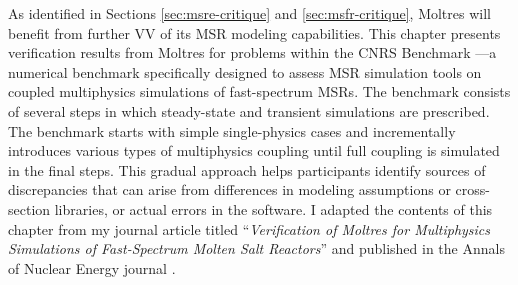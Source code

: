 As identified in Sections \ref{sec:msre-critique} and \ref{sec:msfr-critique},
Moltres will benefit from further \gls{VV} of its
\gls{MSR} modeling capabilities. This chapter presents verification
results from Moltres for problems within the CNRS Benchmark
\cite{tiberga_results_2020}---a numerical benchmark specifically designed to
assess \gls{MSR} simulation tools on coupled multiphysics simulations of
fast-spectrum \glspl{MSR}. The benchmark consists of several steps in which
steady-state and transient simulations are prescribed. The benchmark starts with simple
single-physics cases and incrementally introduces various types of
multiphysics coupling until full coupling is simulated in the final steps. This
gradual approach helps participants identify sources of discrepancies
that can arise from differences in modeling assumptions or
cross-section libraries, or actual errors in the software. I adapted the
contents of this chapter from my journal article titled
``\textit{Verification of Moltres for Multiphysics Simulations of Fast-Spectrum
Molten Salt Reactors}'' and published in the Annals of Nuclear Energy journal
\cite{park_verification_2022}.





